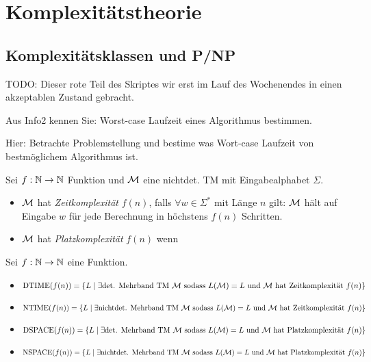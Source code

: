 \section[Komplexitätstheorie]{Komplexitätstheorie}
\subsection{Komplexitätsklassen und P/NP}

{\color{red} TODO: Dieser rote Teil des Skriptes wir erst im Lauf des Wochenendes in einen akzeptablen Zustand gebracht.

Aus Info2 kennen Sie: Worst-case Laufzeit eines Algorithmus bestimmen.

Hier: Betrachte Problemstellung und bestime was Wort-case Laufzeit von bestmöglichem Algorithmus ist.

\begin{Def}
Sei $f:\mathbb{N}\rightarrow\mathbb{N}$ Funktion und $\mathcal{M}$ eine nichtdet. \ac{TM} mit Eingabealphabet $\Sigma$.
\begin{itemize}
 \item $\mathcal{M}$ hat \emph{Zeitkomplexität} $f(n)$, falls $\forall w\in\Sigma^*$ mit Länge $n$ gilt: $\mathcal{M}$ hält auf Eingabe $w$ für jede Berechnung in höchstens $f(n)$ Schritten.
 \item $\mathcal{M}$ hat \emph{Platzkomplexität} $f(n)$ wenn
\end{itemize}
\end{Def}


\begin{Def}[name={[$\NTIME$ Klasse]}]
	Sei $f:\N\->\N$ eine Funktion.
	\begin{itemize}
	 \item $\operatorname{DTIME}(f(n)) = \{L\mid \exists \text{det. Mehrband TM $\mathcal{M}$ sodass $L(\mathcal{M})=L$ und $\mathcal{M}$ hat Zeitkomplexität $f(n)$} \} $
	 \item $\operatorname{NTIME}(f(n)) = \{L\mid \exists \text{nichtdet. Mehrband TM $\mathcal{M}$ sodass $L(\mathcal{M})=L$ und $\mathcal{M}$ hat Zeitkomplexität $f(n)$} \} $
	 \item $\operatorname{DSPACE}(f(n)) = \{L\mid \exists \text{det. Mehrband TM $\mathcal{M}$ sodass $L(\mathcal{M})=L$ und $\mathcal{M}$ hat Platzkomplexität $f(n)$} \} $
	 \item $\operatorname{NSPACE}(f(n)) = \{L\mid \exists \text{nichtdet. Mehrband TM $\mathcal{M}$ sodass $L(\mathcal{M})=L$ und $\mathcal{M}$ hat Platzkomplexität $f(n)$} \} $
	\end{itemize}

\end{Def}

}
